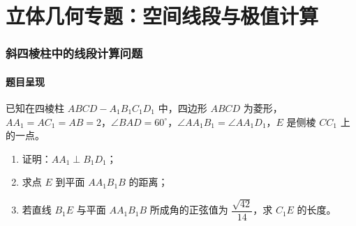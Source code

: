 \documentclass[11pt,a4paper]{ctexart}
\begin{document}

\newpage
\part{立体几何专题：空间线段与极值计算}

\section{斜四棱柱中的线段计算问题}

\subsection{题目呈现}
已知在四棱柱 $ABCD-A_1B_1C_1D_1$ 中，四边形 $ABCD$ 为菱形，$AA_1 = AC_1 = AB = 2$，$\angle BAD = 60^\circ$，$\angle AA_1B_1 = \angle AA_1D_1$，$E$ 是侧棱 $CC_1$ 上的一点。
\begin{enumerate}
    \item 证明：$AA_1 \perp B_1D_1$；
    \item 求点 $E$ 到平面 $AA_1B_1B$ 的距离；
    \item 若直线 $B_1E$ 与平面 $AA_1B_1B$ 所成角的正弦值为 $\dfrac{\sqrt{42}}{14}$，求 $C_1E$ 的长度。
\end{enumerate}
\end{document}
